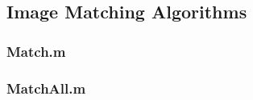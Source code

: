 \subsection{Image Matching Algorithms}
\subsubsection{Match.m}


\subsubsection{MatchAll.m}

%
%
%
%
%
%
%
%
%
